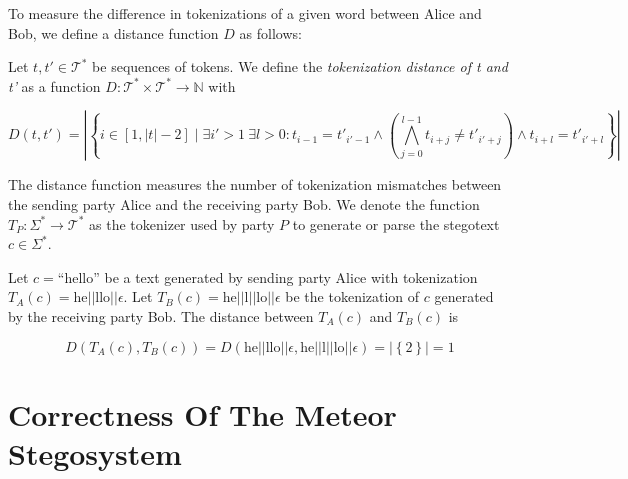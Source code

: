 To measure the difference in tokenizations of a given word between Alice and Bob, we define a distance function $D$ as follows:

\begin{definition}
Let $t, t' \in \mathcal{T}^*$ be sequences of tokens.
We define the \emph{tokenization distance of t and t'} as a function $D \colon \mathcal{T}^* \times \mathcal{T}^* \rightarrow \mathbb{N}$ with

$$D(t, t') = \left| \left\{ i \in [1, |t|-2] \mid \exists i' > 1~ \exists l > 0: t_{i-1} = t'_{i'-1} \land \left( \bigwedge_{j=0}^{l-1} t_{i+j} \neq t'_{i'+j} \right) \land t_{i+l} = t'_{i'+l} \right\} \right|$$
\end{definition}

The distance function measures the number of tokenization mismatches between the sending party Alice and the receiving party Bob.
We denote the function $T_P \colon \Sigma^* \rightarrow \mathcal{T}^*$ as the tokenizer used by party $P$ to generate or parse the stegotext $c \in \Sigma^*$.

\begin{example}
Let $c = \textrm{``hello''}$ be a text generated by sending party Alice with tokenization $T_A(c) = \textrm{he}||\textrm{llo}||\epsilon$.
Let $T_B(c) = \textrm{he}||\textrm{l}||\textrm{lo}||\epsilon$ be the tokenization of $c$ generated by the receiving party Bob.
The distance between $T_A(c)$ and $T_B(c)$ is 

$$
D(T_A(c), T_B(c)) 
= D( \textrm{he}||\textrm{llo}||\epsilon, \textrm{he}||\textrm{l}||\textrm{lo}||\epsilon)
= \left| \left\{ 2 \right\} \right| = 1
$$
\end{example}






\section{Correctness Of The Meteor Stegosystem}

